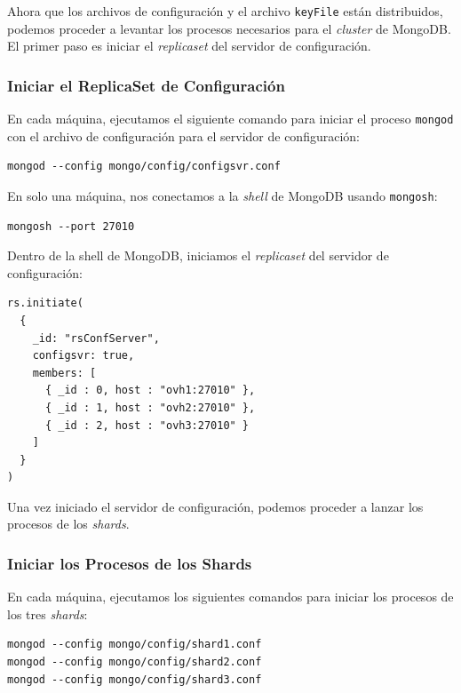 Ahora que los archivos de configuración y el archivo \texttt{keyFile} están distribuidos, podemos proceder a levantar los procesos necesarios para el \textit{cluster} de MongoDB. El primer paso es iniciar el \textit{replicaset} del servidor de configuración.

\subsubsection*{Iniciar el ReplicaSet de Configuración}

En cada máquina, ejecutamos el siguiente comando para iniciar el proceso \texttt{mongod} con el archivo de configuración para el servidor de configuración:

\begin{verbatim}
mongod --config mongo/config/configsvr.conf
\end{verbatim}

\noindent En solo una máquina, nos conectamos a la \textit{shell} de MongoDB usando \texttt{mongosh}:

\begin{verbatim}
mongosh --port 27010
\end{verbatim}

\noindent Dentro de la shell de MongoDB, iniciamos el \textit{replicaset} del servidor de configuración:

\begin{verbatim}
rs.initiate(
  {
    _id: "rsConfServer",
    configsvr: true,
    members: [
      { _id : 0, host : "ovh1:27010" },
      { _id : 1, host : "ovh2:27010" },
      { _id : 2, host : "ovh3:27010" }
    ]
  }
)
\end{verbatim}

\noindent Una vez iniciado el servidor de configuración, podemos proceder a lanzar los procesos de los \textit{shards}.

\subsubsection*{Iniciar los Procesos de los Shards}

En cada máquina, ejecutamos los siguientes comandos para iniciar los procesos de los tres \textit{shards}:

\begin{verbatim}
mongod --config mongo/config/shard1.conf
mongod --config mongo/config/shard2.conf
mongod --config mongo/config/shard3.conf
\end{verbatim}

